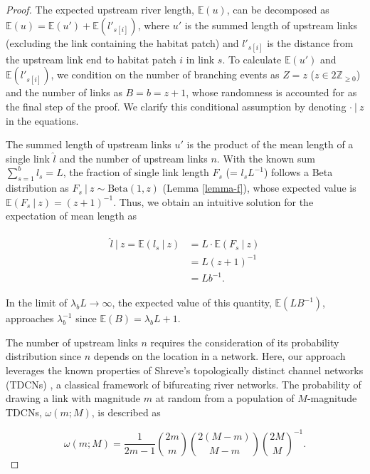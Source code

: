 \documentclass[11pt, class=article, crop=false]{standalone}
\theoremstyle{definition}
\begin{document}
\begin{proof}
The expected upstream river length, $\mathbb{E}(u)$, can be decomposed as $\mathbb{E}(u) = \mathbb{E}(u') + \mathbb{E}(l'_{s[i]})$, where $u'$ is the summed length of upstream links (excluding the link containing the habitat patch) and $l'_{s[i]}$ is the distance from the upstream link end to habitat patch $i$ in link $s$.
To calculate $\mathbb{E}(u')$ and $\mathbb{E}(l'_{s[i]})$, we condition on the number of branching events as $Z = z$ ($z \in 2\mathbb{Z}_{\ge 0}$) and the number of links as $B = b = z + 1$, whose randomness is accounted for as the final step of the proof.
We clarify this conditional assumption by denoting $\cdot ~|~ z$ in the equations.

The summed length of upstream links $u'$ is the product of the mean length of a single link $\hat{l}$ and the number of upstream links $n$.
With the known sum $\sum_{s=1}^b l_s = L$, the fraction of single link length $F_s$ (= $l_s L^{-1}$) follows a Beta distribution as $F_s ~|~ z \sim \mbox{Beta}(1, z)$ (Lemma \ref{lemma-f}), whose expected value is $\mathbb{E}(F_s~|~z) = (z + 1)^{-1}$.
Thus, we obtain an intuitive solution for the expectation of mean length as

\begin{align}
    \begin{split}
    \hat{l}~|~z = \mathbb{E}(l_s~|~z) &= L \cdot \mathbb{E}(F_s~|~z)\\
                                      &= L(z + 1)^{-1}\\
                                      &= Lb^{-1}.
    \end{split}
\end{align}

In the limit of $\lambda_b L \rightarrow \infty$, the expected value of this quantity, $\mathbb{E}(LB^{-1})$, approaches $\lambda_b^{-1}$ since $\mathbb{E}(B) = \lambda_b L + 1$.

The number of upstream links $n$ requires the consideration of its probability distribution since $n$ depends on the location in a network.
Here, our approach leverages the known properties of Shreve's topologically distinct channel networks (TDCNs) \cite{shreve_infinite_1967}, a classical framework of bifurcating river networks.
The probability of drawing a link with magnitude $m$ at random from a population of $M$-magnitude TDCNs, $\omega(m; M)$, is described as

\begin{equation}
    \omega(m; M) = \frac{1}{2m - 1} \binom{2m}{m} \binom{2(M - m)}{M - m} \binom{2M}{M}^{-1}.
\end{equation}


\end{proof}
\end{document}
